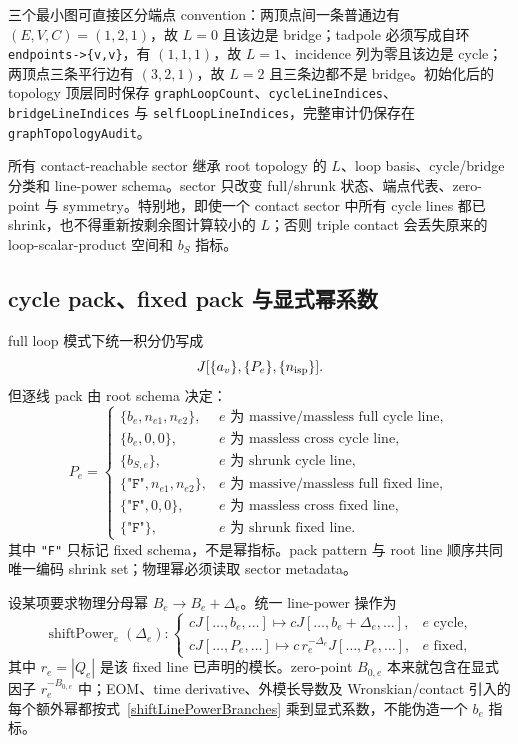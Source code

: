 ﻿\documentclass[a4paper,11pt]{article}
\begin{document}
三个最小图可直接区分端点 convention：两顶点间一条普通边有 $(E,V,C)=(1,2,1)$，故 $L=0$ 且该边是 bridge；tadpole 必须写成自环 \texttt{endpoints->\{v,v\}}，有 $(1,1,1)$，故 $L=1$、incidence 列为零且该边是 cycle；两顶点三条平行边有 $(3,2,1)$，故 $L=2$ 且三条边都不是 bridge。初始化后的 topology 顶层同时保存 \texttt{graphLoopCount}、\texttt{cycleLineIndices}、\texttt{bridgeLineIndices} 与 \texttt{selfLoopLineIndices}，完整审计仍保存在 \texttt{graphTopologyAudit}。

所有 contact-reachable sector 继承 root topology 的 $L$、loop basis、cycle/bridge 分类和 line-power schema。sector 只改变 full/shrunk 状态、端点代表、zero-point 与 symmetry。特别地，即使一个 contact sector 中所有 cycle lines 都已 shrink，也不得重新按剩余图计算较小的 $L$；否则 triple contact 会丢失原来的 loop-scalar-product 空间和 $b_S$ 指标。

\subsection{cycle pack、fixed pack 与显式幂系数}

full loop 模式下统一积分仍写成
\begin{equation}
 J[\{a_v\},\{P_e\},\{n_{\rm isp}\}].
\end{equation}
但逐线 pack 由 root schema 决定：
\begin{equation}
  P_e=
 \begin{cases}
  \{b_e,n_{e1},n_{e2}\},&e\text{ 为 massive/massless full cycle line},\\
  \{b_e,0,0\},&e\text{ 为 massless cross cycle line},\\
  \{b_{S,e}\},&e\text{ 为 shrunk cycle line},\\
  \{\texttt{"F"},n_{e1},n_{e2}\},&e\text{ 为 massive/massless full fixed line},\\
  \{\texttt{"F"},0,0\},&e\text{ 为 massless cross fixed line},\\
  \{\texttt{"F"}\},&e\text{ 为 shrunk fixed line}.
 \end{cases}
 \label{cycleFixedPackSchema}
\end{equation}
其中 \texttt{"F"} 只标记 fixed schema，不是幂指标。pack pattern 与 root line 顺序共同唯一编码 shrink set；物理幂必须读取 sector metadata。

设某项要求物理分母幂 $B_e\to B_e+\Delta_e$。统一 line-power 操作为
\begin{equation}
 \operatorname{shiftPower}_e(\Delta_e):
 \begin{cases}
  cJ[\ldots,b_e,\ldots]\mapsto cJ[\ldots,b_e+\Delta_e,\ldots],&e\text{ cycle},\\
  cJ[\ldots,P_e,\ldots]\mapsto c\,r_e^{-\Delta_e}J[\ldots,P_e,\ldots],&e\text{ fixed},
 \end{cases}
 \label{shiftLinePowerBranches}
\end{equation}
其中 $r_e=|Q_e|$ 是该 fixed line 已声明的模长。zero-point $B_{0,e}$ 本来就包含在显式因子 $r_e^{-B_{0,e}}$ 中；EOM、time derivative、外模长导数及 Wronskian/contact 引入的每个额外幂都按式~\eqref{shiftLinePowerBranches} 乘到显式系数，不能伪造一个 $b_e$ 指标。
\end{document}
